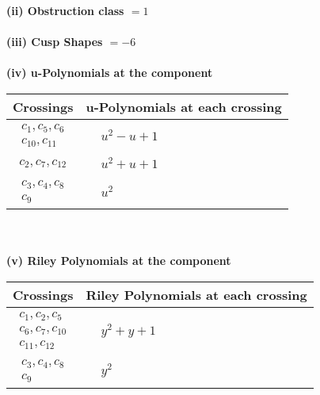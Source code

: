\documentclass[1p]{elsarticle_modified}
\theoremstyle{definition}
\begin{document}
\flushleft \textbf{(ii) Obstruction class $= 1$}\\~\\
\flushleft \textbf{(iii) Cusp Shapes $= -6$}\\~\\
\newpage\renewcommand{\arraystretch}{1}
\flushleft \textbf{(iv) u-Polynomials at the component}\newline \\
\begin{tabular}{m{50pt}|m{274pt}}
Crossings & \hspace{64pt}u-Polynomials at each crossing \\
\hline $$\begin{aligned}c_{1},c_{5},c_{6}\\c_{10},c_{11}\end{aligned}$$&$\begin{aligned}
&u^2- u+1
\end{aligned}$\\
\hline $$\begin{aligned}c_{2},c_{7},c_{12}\end{aligned}$$&$\begin{aligned}
&u^2+u+1
\end{aligned}$\\
\hline $$\begin{aligned}c_{3},c_{4},c_{8}\\c_{9}\end{aligned}$$&$\begin{aligned}
&u^2
\end{aligned}$\\
\hline
\end{tabular}\\~\\
\newpage\renewcommand{\arraystretch}{1}
\flushleft \textbf{(v) Riley Polynomials at the component}\newline \\
\begin{tabular}{m{50pt}|m{274pt}}
Crossings & \hspace{64pt}Riley Polynomials at each crossing \\
\hline $$\begin{aligned}c_{1},c_{2},c_{5}\\c_{6},c_{7},c_{10}\\c_{11},c_{12}\end{aligned}$$&$\begin{aligned}
&y^2+y+1
\end{aligned}$\\
\hline $$\begin{aligned}c_{3},c_{4},c_{8}\\c_{9}\end{aligned}$$&$\begin{aligned}
&y^2
\end{aligned}$\\
\hline
\end{tabular}\\~\\
\end{document}
